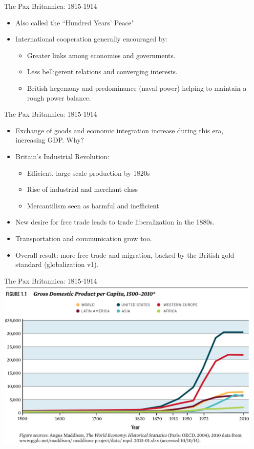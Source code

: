 \documentclass{beamer}
\begin{document}
\begin{frame}{\LARGE The Pax Britannica: 1815-1914}
	\begin{itemize}
		\item Also called the ``Hundred Years' Peace"
		\item International cooperation generally encouraged by:
		\begin{itemize}
			\item Greater links among economies and governments.
			\item Less belligerent relations and converging interests.
			\item British hegemony and predominance (naval power) helping to maintain a rough power balance.
		\end{itemize}
	\end{itemize}
\end{frame}

\begin{frame}{\LARGE The Pax Britannica: 1815-1914}
	\begin{itemize}
		\item Exchange of goods and economic integration increase during this era, increasing GDP. Why? \pause
		\item Britain's Industrial Revolution: \pause
		\begin{itemize}
			\item Efficient, large-scale production by 1820s
			\item Rise of industrial and merchant class
			\item Mercantilism seen as harmful and inefficient \pause
		\end{itemize}
		\item New desire for free trade leads to trade liberalization in the 1880s.
		\item Transportation and communication grow too.
		\item Overall result: more free trade and migration, backed by the British gold standard (globalization v1).	
	\end{itemize}
\end{frame}

\begin{frame}{\LARGE The Pax Britannica: 1815-1914}
	\centering
	\includegraphics[width=\textwidth,height=.9\textheight,keepaspectratio]{500yearGDP.jpg}	
\end{frame}
\end{document}
